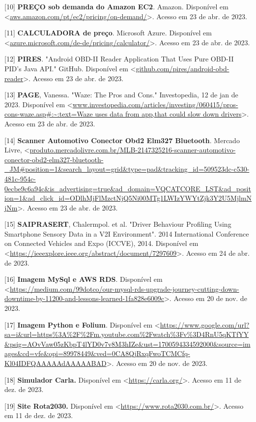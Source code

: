 [10] \textbf{PREÇO sob demanda do Amazon EC2}. Amazon. Disponível em <\url{aws.amazon.com/pt/ec2/pricing/on-demand/}>. Acesso em 23 de abr. de 2023.


[11] \textbf{CALCULADORA de preço}. Microsoft Azure. Disponível em <\url{azure.microsoft.com/de-de/pricing/calculator/}>. Acesso em 23 de abr. de 2023.

[12] \textbf{PIRES}. "Android OBD-II Reader Application That Uses Pure OBD-II PID's Java API." GitHub. Disponível em <\url{github.com/pires/android-obd-reader}>. Acesso em 23 de abr. de 2023.

[13] \textbf{PAGE}, Vanessa. "Waze: The Pros and Cons." Investopedia, 12 de jan de 2023. Disponível em <\url{www.investopedia.com/articles/investing/060415/pros-cons-waze.asp#:~:text=Waze uses data from app,that could slow down drivers}>. Acesso em 23 de abr. de 2023.


[14] \textbf{Scanner Automotivo Conector Obd2 Elm327 Bluetooth}. Mercado Livre, <\url{produto.mercadolivre.com.br/MLB-2147325216-scanner-automotivo-conector-obd2-elm327-bluetooth-_JM#position=1&search_layout=grid&type=pad&tracking_id=509523dc-c530-481c-954c-0ecbe9c6a94c&is_advertising=true&ad_domain=VQCATCORE_LST&ad_position=1&ad_click_id=ODlhMjFlMzctNjQ5Ni00MTg1LWIzYWYtZjk3Y2U5MjlmNjNm}>. Acesso em 23 de abr. de 2023.

[15] \textbf{SAIPRASERT}, Chalermpol. et al. "Driver Behaviour Profiling Using Smartphone Sensory Data in a V2I Environment". 2014 International Conference on Connected Vehicles and Expo (ICCVE), 2014. Disponível em <\url{https://ieeexplore.ieee.org/abstract/document/7297609}>. Acesso em 24 de abr. de 2023.

[16] \textbf{Imagem MySql e AWS RDS}. Disponível em <\url{https://medium.com/99dotco/our-mysql-rds-upgrade-journey-cutting-down-downtime-by-11200-and-lessons-learned-1fa828e6009c}>. Acesso em 20 de nov. de 2023.

[17] \textbf{Imagem Python e Folium}. Disponível em <\url{https://www.google.com/url?sa=i&url=https%3A%2F%2Fm.youtube.com%2Fwatch%3Fv%3D4RnU5qKTfYY&psig=AOvVaw05zKbpT4lYD0v7v8M3hIZe&ust=1700594334592000&source=images&cd=vfe&opi=89978449&ved=0CA8QjRxqFwoTCMCfq-Kl04IDFQAAAAAdAAAAABAD}>. Acesso em 20 de nov. de 2023.

[18] \textbf{Simulador Carla.} Disponível em <\url{https://carla.org/}>. Acesso em 11 de dez. de 2023.

[19] \textbf{Site Rota2030.} Disponível em <\url{https://www.rota2030.com.br/}>.  Acesso em 11 de dez. de 2023.

